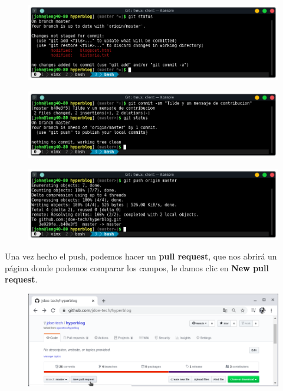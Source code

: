 \documentclass{article}
\begin{document}
\begin{figure}[h!]
  \centering
  \includegraphics[scale=0.75]{./Pictures/312_status.png}
\end{figure}

\begin{figure}[h!]
  \centering
  \includegraphics[scale=0.75]{./Pictures/313_commit_status.png}
\end{figure}

\begin{figure}[h!]
  \centering
  \includegraphics[scale=0.75]{./Pictures/314_push.png}
\end{figure}

Una vez hecho el push, podemos hacer un \textbf{pull request}, que nos abrirá
un página donde podemos comparar los campos, le damos clic en \textbf{New pull
request}.

\begin{figure}[h!]
  \centering
  \includegraphics[scale=0.75]{./Pictures/315_new_pull_request.png}
\end{figure}
\end{document}
